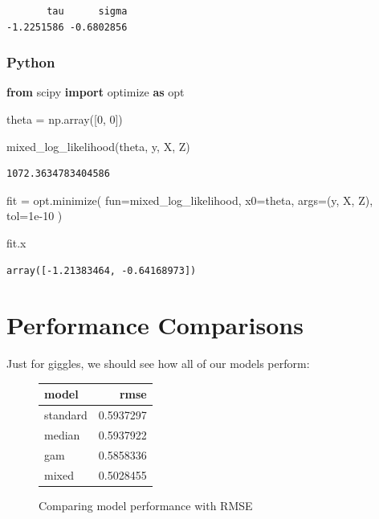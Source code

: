 \documentclass[
  letterpaper,
]{krantz}
\newenvironment{Shaded}{}{}
\newcommand{\DecValTok}[1]{\textcolor[rgb]{0.25,0.63,0.44}{#1}}
\newcommand{\FloatTok}[1]{\textcolor[rgb]{0.25,0.63,0.44}{#1}}
\newcommand{\ImportTok}[1]{\textcolor[rgb]{0.00,0.50,0.00}{\textbf{#1}}}
\newcommand{\NormalTok}[1]{#1}
\newcommand{\OperatorTok}[1]{\textcolor[rgb]{0.40,0.40,0.40}{#1}}
\begin{document}
\begin{verbatim}
       tau      sigma 
-1.2251586 -0.6802856 
\end{verbatim}

\subsubsection{Python}

\begin{Shaded}
\begin{Highlighting}[]
\ImportTok{from}\NormalTok{ scipy }\ImportTok{import}\NormalTok{ optimize }\ImportTok{as}\NormalTok{ opt}

\NormalTok{theta }\OperatorTok{=}\NormalTok{ np.array([}\DecValTok{0}\NormalTok{, }\DecValTok{0}\NormalTok{])}

\NormalTok{mixed\_log\_likelihood(theta, y, X, Z)}
\end{Highlighting}
\end{Shaded}

\begin{verbatim}
1072.3634783404586
\end{verbatim}

\begin{Shaded}
\begin{Highlighting}[]
\NormalTok{fit }\OperatorTok{=}\NormalTok{ opt.minimize(}
\NormalTok{    fun}\OperatorTok{=}\NormalTok{mixed\_log\_likelihood,}
\NormalTok{    x0}\OperatorTok{=}\NormalTok{theta,}
\NormalTok{    args}\OperatorTok{=}\NormalTok{(y, X, Z),}
\NormalTok{    tol}\OperatorTok{=}\FloatTok{1e{-}10}
\NormalTok{)}

\NormalTok{fit.x}
\end{Highlighting}
\end{Shaded}

\begin{verbatim}
array([-1.21383464, -0.64168973])
\end{verbatim}

\section{Performance Comparisons}\label{performance-comparisons}

Just for giggles, we should see how all of our models perform:

\begin{figure}

{\centering 

\hypertarget{fig-model_performance_comp-1}{}
\begin{longtable*}{lr}
\toprule
model & rmse \\ 
\midrule\addlinespace[2.5pt]
standard & 0.5937297 \\ 
median & 0.5937922 \\ 
gam & 0.5858336 \\ 
mixed & 0.5028455 \\ 
\bottomrule
\end{longtable*}

}

\caption{\label{fig-model_performance_comp}Comparing model performance
with RMSE}

\end{figure}
\end{document}
